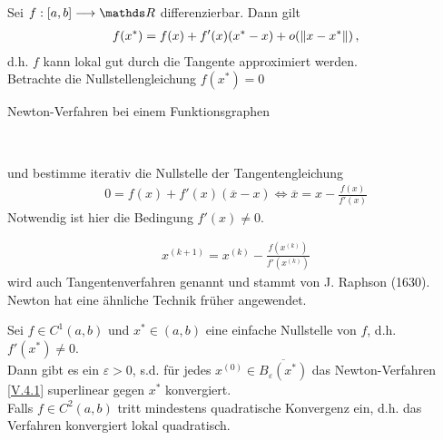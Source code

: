  
Sei $f:[a,b]\longrightarrow \R$ differenzierbar. Dann gilt
\begin{gather*}
  f(x^{*}) = f(x) + f'(x)(x^{*}-x)+o(\left\| x-x^{*} \right\|) \, ,
\end{gather*} 
d.h. $f$ kann lokal gut durch die Tangente approximiert werden. \\
Betrachte die Nullstellengleichung $f(x^{*}) = 0$ \\

\begin{image}{Newton-Verfahren bei einem Funktionsgraphen}
  \\
\end{image}
\label{im5.4}

und bestimme iterativ die Nullstelle der Tangentengleichung
\begin{gather*}
  0=f(x) + f'(x)(\overline{x}-x) \Leftrightarrow \overline{x}= x-\frac{f(x)}{f'(x)}
\end{gather*}
Notwendig ist hier die Bedingung $f'(x) \neq 0$.


\begin{gather}
  x^{(k+1)} = x^{(k)} - \frac{f(x^{(k)})}{f'(x^{(k)})}
  \label{V.4.1}
\end{gather}
wird auch Tangentenverfahren genannt und stammt von
J. Raphson (1630). Newton hat eine ähnliche Technik früher angewendet.

\begin{Satze}
  \label{5.4.2}
  Sei $f\in C^1(a,b)$ und $x^{*}\in (a,b)$ eine einfache Nullstelle von $f$, d.h. $f'(x^{*})\neq 0$. \\
  Dann gibt es ein  $\varepsilon >0$, s.d. für jedes $x^{(0)}\in\overline{B_\varepsilon(x^{*})}$
  das Newton-Verfahren \eqref{V.4.1} superlinear gegen $x^{*}$ konvergiert.\\
  Falls $f\in C^2(a,b) $ tritt mindestens quadratische Konvergenz ein, d.h. das Verfahren
  konvergiert lokal quadratisch.
\end{Satze}

